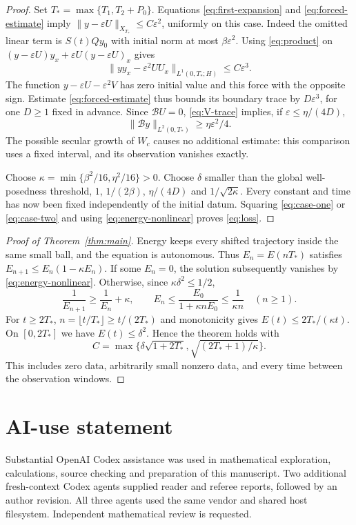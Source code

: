 \documentclass[11pt]{article}
\theoremstyle{remark}\newtheorem{remark}[theorem]{Remark}
\numberwithin{equation}{section}
\begin{document}
\begin{proof}
Set $T_* =\max\{T_1,T_2+P_0\}$.
Equations \eqref{eq:first-expansion} and \eqref{eq:forced-estimate} imply
$\|y-\varepsilon U\|_{X_{T_*}}\le C\varepsilon^2$, uniformly on this case.
Indeed the omitted linear term is $S(t)Qy_0$ with initial norm at most
$\beta\varepsilon^2$. Using \eqref{eq:product} on
$(y-\varepsilon U)y_x+\varepsilon U(y-\varepsilon U)_x$ gives
\[
 \|yy_x-\varepsilon^2UU_x\|_{L^1(0,T_*;H)}\le C\varepsilon^3.
\]
The function $y-\varepsilon U-\varepsilon^2V$ has zero initial value and this
force with the opposite sign. Estimate \eqref{eq:forced-estimate} thus bounds
its boundary trace by $D\varepsilon^3$, for one $D\ge1$ fixed in advance.
Since $\mathcal BU=0$, \eqref{eq:V-trace} implies, if
$\varepsilon\le\eta/(4D)$,
\begin{equation}\label{eq:case-two}
 \|\mathcal By\|_{L^2(0,T_*)}\ge\eta\varepsilon^2/4.
\end{equation}
The possible secular growth of $W_c$ causes no additional estimate: this
comparison uses a fixed interval, and its observation vanishes exactly.

Choose $\kappa=\min\{\beta^2/16,\eta^2/16\}>0$.
Choose $\delta$ smaller than the global well-posedness threshold, $1$,
$1/(2\beta)$, $\eta/(4D)$ and $1/\sqrt{2\kappa}$.
Every constant and time has now been fixed independently of the initial
datum. Squaring \eqref{eq:case-one} or \eqref{eq:case-two} and using
\eqref{eq:energy-nonlinear} proves \eqref{eq:loss}.
\end{proof}

\begin{proof}[Proof of Theorem~\ref{thm:main}]
Energy keeps every shifted trajectory inside the same small ball, and the
equation is autonomous. Thus $E_n=E(nT_*)$ satisfies
$E_{n+1}\le E_n(1-\kappa E_n)$.
If some $E_n=0$, the solution subsequently vanishes by
\eqref{eq:energy-nonlinear}. Otherwise, since $\kappa\delta^2\le1/2$,
\[
 \frac1{E_{n+1}}\ge\frac1{E_n}+\kappa,\qquad
 E_n\le\frac{E_0}{1+\kappa nE_0}\le\frac1{\kappa n}\quad(n\ge1).
\]
For $t\ge2T_*$, $n=\lfloor t/T_*\rfloor\ge t/(2T_*)$ and monotonicity gives
$E(t)\le2T_*/(\kappa t)$. On $[0,2T_*]$ we have $E(t)\le\delta^2$.
Hence the theorem holds with
\[
 C=\max\{\delta\sqrt{1+2T_*},\sqrt{(2T_*+1)/\kappa}\}.
\]
This includes zero data, arbitrarily small nonzero data, and every time
between the observation windows.
\end{proof}
\section*{AI-use statement}
Substantial OpenAI Codex assistance was used in mathematical exploration,
calculations, source checking and preparation of this manuscript. Two additional
fresh-context Codex agents supplied reader and referee reports, followed by an
author revision. All three agents used the same vendor and shared host filesystem.
Independent mathematical review is requested.
\end{document}
